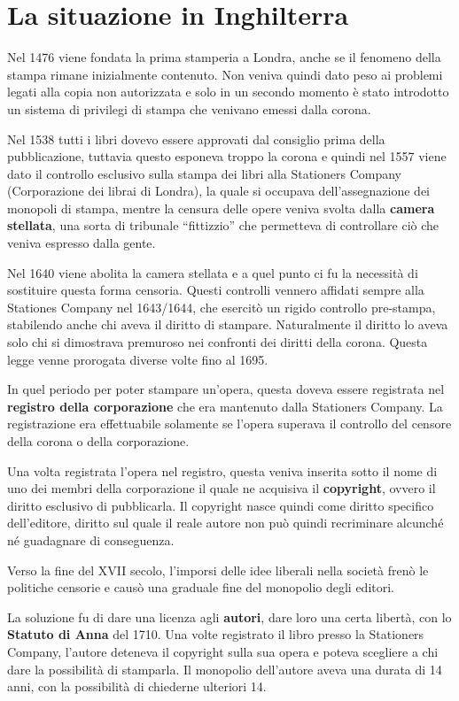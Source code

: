 \section{La situazione in Inghilterra}

Nel 1476 viene fondata la prima stamperia a Londra, anche se il fenomeno della stampa rimane inizialmente contenuto. Non veniva quindi dato peso ai problemi legati alla copia non autorizzata e solo in un secondo momento è stato introdotto un sistema di privilegi di stampa che venivano emessi dalla corona. 

Nel 1538 tutti i libri dovevo essere approvati dal consiglio prima della pubblicazione, tuttavia questo esponeva troppo la corona e quindi nel 1557 viene dato il controllo esclusivo sulla stampa dei libri alla Stationers Company (Corporazione dei librai di Londra), la quale si occupava dell'assegnazione dei monopoli di stampa, mentre la censura delle opere veniva svolta dalla \textbf{camera stellata}, una sorta di tribunale ``fittizzio'' che permetteva di controllare ciò che veniva espresso dalla gente.

Nel 1640 viene abolita la camera stellata e a quel punto ci fu la necessità di sostituire questa forma censoria. Questi controlli vennero affidati sempre alla Stationes Company nel 1643/1644, che esercitò un rigido controllo pre-stampa, stabilendo anche chi aveva il diritto di stampare. Naturalmente il diritto lo aveva solo chi si dimostrava premuroso nei confronti dei diritti della corona. Questa legge venne prorogata diverse volte fino al 1695. 

In quel periodo per poter stampare un'opera, questa doveva essere registrata nel \textbf{registro della corporazione} che era mantenuto dalla Stationers Company. La registrazione era effettuabile solamente se l'opera superava il controllo del censore della corona o della corporazione.

Una volta registrata l'opera nel registro, questa veniva inserita sotto il nome di uno dei membri della corporazione il quale ne acquisiva il \textbf{copyright}, ovvero il diritto esclusivo di pubblicarla.
Il copyright nasce quindi come diritto specifico dell'editore, diritto sul quale il reale autore non può quindi recriminare alcunché né guadagnare di conseguenza.

Verso la fine del XVII secolo, l'imporsi delle idee liberali nella società frenò le politiche censorie e causò una graduale fine del monopolio degli editori.

La soluzione fu di dare una licenza agli \textbf{autori}, dare loro una certa libertà, con lo \textbf{Statuto di Anna} del 1710.  Una volte registrato il libro presso la Stationers Company, l'autore deteneva il copyright sulla sua opera e poteva scegliere a chi dare la possibilità di stamparla.
Il monopolio dell'autore aveva una durata di 14 anni, con la possibilità di chiederne ulteriori 14.

